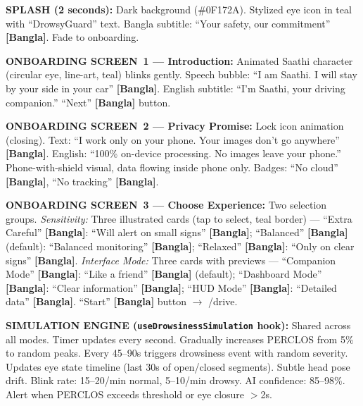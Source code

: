 \documentclass[sigconf]{acmart}
\begin{document}
 
\begin{promptbox}
\textbf{SPLASH (2 seconds):} Dark background (\#0F172A). Stylized eye icon in teal with ``DrowsyGuard'' text. Bangla subtitle: ``Your safety, our commitment'' \textbf{[Bangla]}. Fade to onboarding.
 
\textbf{ONBOARDING SCREEN~1 --- Introduction:} Animated Saathi character (circular eye, line-art, teal) blinks gently. Speech bubble: ``I am Saathi. I will stay by your side in your car'' \textbf{[Bangla]}. English subtitle: ``I'm Saathi, your driving companion.'' ``Next'' \textbf{[Bangla]} button.
 
\textbf{ONBOARDING SCREEN~2 --- Privacy Promise:} Lock icon animation (closing). Text: ``I work only on your phone. Your images don't go anywhere'' \textbf{[Bangla]}. English: ``100\% on-device processing. No images leave your phone.'' Phone-with-shield visual, data flowing inside phone only. Badges: ``No cloud'' \textbf{[Bangla]}, ``No tracking'' \textbf{[Bangla]}.
 
\textbf{ONBOARDING SCREEN~3 --- Choose Experience:} Two selection groups. \textit{Sensitivity:} Three illustrated cards (tap to select, teal border) --- ``Extra Careful'' \textbf{[Bangla]}: ``Will alert on small signs'' \textbf{[Bangla]}; ``Balanced'' \textbf{[Bangla]} (default): ``Balanced monitoring'' \textbf{[Bangla]}; ``Relaxed'' \textbf{[Bangla]}: ``Only on clear signs'' \textbf{[Bangla]}. \textit{Interface Mode:} Three cards with previews --- ``Companion Mode'' \textbf{[Bangla]}: ``Like a friend'' \textbf{[Bangla]} (default); ``Dashboard Mode'' \textbf{[Bangla]}: ``Clear information'' \textbf{[Bangla]}; ``HUD Mode'' \textbf{[Bangla]}: ``Detailed data'' \textbf{[Bangla]}. ``Start'' \textbf{[Bangla]} button $\rightarrow$ /drive.
 
\textbf{SIMULATION ENGINE (\texttt{useDrowsinessSimulation} hook):} Shared across all modes. Timer updates every second. Gradually increases PERCLOS from 5\% to random peaks. Every 45--90s triggers drowsiness event with random severity. Updates eye state timeline (last 30s of open/closed segments). Subtle head pose drift. Blink rate: 15--20/min normal, 5--10/min drowsy. AI confidence: 85--98\%. Alert when PERCLOS exceeds threshold or eye closure $>$2s.
 

\end{promptbox}
\end{document}
